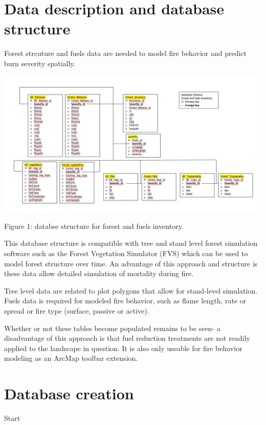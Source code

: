 \documentclass[]{book}
\begin{document}
\hypertarget{data}{%
\chapter{Data description and database structure}\label{data}}

Forest strcuture and fuels data are needed to model fire behavior and predict burn severity spatially.

\begin{center}\includegraphics{db_structure} \end{center}

Figure 1: databse structure for forest and fuels inventory.

This database structure is compatible with tree and stand level forest simulation software such as the Forest Vegetation Simulator (FVS) which can be used to model forest structure over time. An advantage of this approach and structure is these data allow detailed simulation of mortality during fire.

Tree level data are related to plot polygons that allow for stand-level simulation. Fuels data is required for modeled fire behavior, such as flame length, rate or spread or fire type (surface, passive or active).

Whether or not these tables become populated remains to be seen- a disadvantage of this approach is that fuel reduction treatments are not readily applied to the landscape in question. It is also only useable for fire behavior modeling as an ArcMap toolbar extension.

\hypertarget{creation}{%
\chapter{Database creation}\label{creation}}

Start
\end{document}

